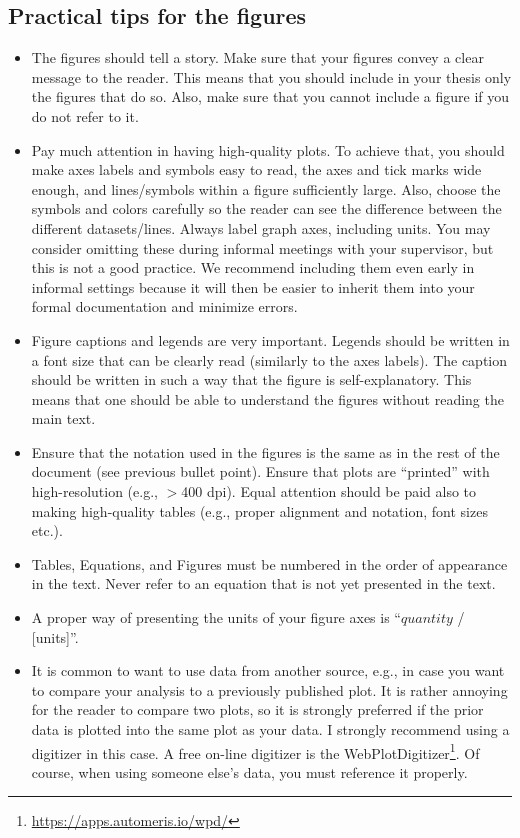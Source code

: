 \documentclass{article}
\begin{document}
\subsection{Practical tips for the figures}    
\begin{itemize}
    \item The figures should tell a story. Make sure that your figures convey a clear message to the reader. This means that you should include in your thesis only the figures that do so. Also, make sure that you cannot include a figure if you do not refer to it.
    \item Pay much attention in having high-quality plots. To achieve that, you should make axes labels and symbols easy to read, the axes and tick marks wide enough, and lines/symbols within a figure sufficiently large. Also, choose the symbols and colors carefully so the reader can see the difference between the different datasets/lines. Always label graph axes, including units. You may consider omitting these during informal meetings with your supervisor, but this is not a good practice. We recommend including them even early in informal settings because it will then be easier to inherit them into your formal documentation and minimize errors.
    \item Figure captions and legends are very important. Legends should be written in a font size that can be clearly read (similarly to the axes labels). The caption should be written in such a way that the figure is self-explanatory. This means that one should be able to understand the figures without reading the main text.
    \item Ensure that the notation used in the figures is the same as in the rest of the document (see previous bullet point). Ensure that plots are “printed” with high-resolution (e.g., $>$400 dpi). Equal attention should be paid also to making high-quality tables (e.g., proper alignment and notation, font sizes etc.).
    \item Tables, Equations, and Figures must be numbered in the order of appearance in the text. Never refer to an equation that is not yet presented in the text.
    \item A proper way of presenting the units of your figure axes is “$quantity$ / [units]”. 
    \item It is common to want to use data from another source, e.g., in case you want to compare your analysis to a previously published plot. It is rather annoying for the reader to compare two plots, so it is strongly preferred if the prior data is plotted into the same plot as your data. I strongly recommend using a digitizer in this case. A free on-line digitizer is the WebPlotDigitizer\footnote{\url{https://apps.automeris.io/wpd/}}. Of course, when using someone else’s data, you must reference it properly.
\end{itemize}
\end{document}
